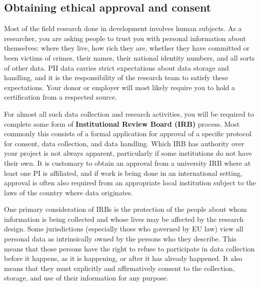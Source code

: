 \subsection{Obtaining ethical approval and consent}

Most of the field research done in development involves human subjects.
As a researcher, you are asking people to trust you with personal information about themselves:
where they live, how rich they are, whether they have committed or been victims of crimes,
their names, their national identity numbers, and all sorts of other data.
PII data carries strict expectations about data storage and handling,
and it is the responsibility of the research team to satisfy these expectations.
Your donor or employer will most likely require you to hold a certification from a respected source.

For almost all such data collection and research activities,
you will be required to complete some form of \textbf{Institutional Review Board (IRB)} process.
Most commonly this consists of a formal application for approval of a specific
protocol for consent, data collection, and data handling.
Which IRB has authority over your project is not always apparent,
particularly if some institutions do not have their own.
It is customary to obtain an approval from a university IRB
where at least one PI is affiliated,
and if work is being done in an international setting,
approval is often also required
from an appropriate local institution subject to the laws of the country where data originates.

One primary consideration of IRBs
is the protection of the people about whom information is being collected
and whose lives may be affected by the research design.
Some jurisdictions (especially those who governed by EU law) view all personal data
as intrinsically owned by the persons who they describe.
This means that those persons have the right to refuse to participate in data collection
before it happens, as it is happening, or after it has already happened.
It also means that they must explicitly and affirmatively consent
to the collection, storage, and use of their information for any purpose.


